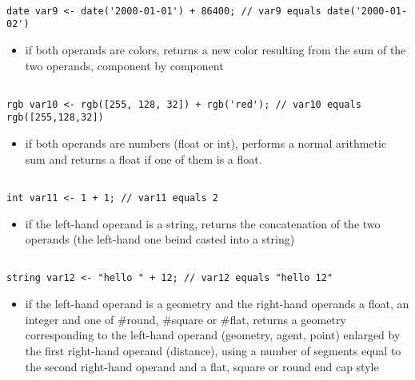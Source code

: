 \documentclass[]{book}
\providecommand{\tightlist}{%
  \setlength{\itemsep}{0pt}\setlength{\parskip}{0pt}}
\theoremstyle{definition}
\theoremstyle{definition}
\theoremstyle{definition}
\theoremstyle{remark}
\begin{document}
\begin{verbatim}
 
date var9 <- date('2000-01-01') + 86400; // var9 equals date('2000-01-02')
\end{verbatim}

\begin{itemize}
\tightlist
\item
  if both operands are colors, returns a new color resulting from the
  sum of the two operands, component by component
\end{itemize}

\begin{verbatim}
 
rgb var10 <- rgb([255, 128, 32]) + rgb('red'); // var10 equals rgb([255,128,32])
\end{verbatim}

\begin{itemize}
\tightlist
\item
  if both operands are numbers (float or int), performs a normal
  arithmetic sum and returns a float if one of them is a float.
\end{itemize}

\begin{verbatim}
 
int var11 <- 1 + 1; // var11 equals 2
\end{verbatim}

\begin{itemize}
\tightlist
\item
  if the left-hand operand is a string, returns the concatenation of the
  two operands (the left-hand one beind casted into a string)
\end{itemize}

\begin{verbatim}
 
string var12 <- "hello " + 12; // var12 equals "hello 12"
\end{verbatim}

\begin{itemize}
\tightlist
\item
  if the left-hand operand is a geometry and the right-hand operands a
  float, an integer and one of \#round, \#square or \#flat, returns a
  geometry corresponding to the left-hand operand (geometry, agent,
  point) enlarged by the first right-hand operand (distance), using a
  number of segments equal to the second right-hand operand and a flat,
  square or round end cap style
\end{itemize}
\end{document}
